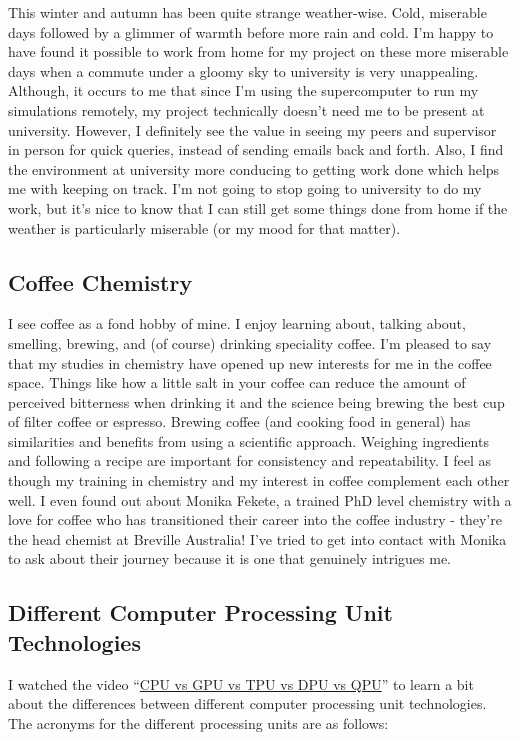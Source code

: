 \documentclass[11pt]{article}
\begin{document}
This winter and autumn has been quite strange weather-wise. Cold, miserable days followed by a glimmer of warmth before more rain and cold. I'm happy to have found it possible to work from home for my project on these more miserable days when a commute under a gloomy sky to university is very unappealing. Although, it occurs to me that since I'm using the supercomputer to run my simulations remotely, my project technically doesn't need me to be present at university. However, I definitely see the value in seeing my peers and supervisor in person for quick queries, instead of sending emails back and forth. Also, I find the environment at university more conducing to getting work done which helps me with keeping on track. I'm not going to stop going to university to do my work, but it's nice to know that I can still get some things done from home if the weather is particularly miserable (or my mood for that matter). 

\subsection{Coffee Chemistry}

I see coffee as a fond hobby of mine. I enjoy learning about, talking about, smelling, brewing, and (of course) drinking speciality coffee. I'm pleased to say that my studies in chemistry have opened up new interests for me in the coffee space. Things like how a little salt in your coffee can reduce the amount of perceived bitterness when drinking it and the science being brewing the best cup of filter coffee or espresso. Brewing coffee (and cooking food in general) has similarities and benefits from using a scientific approach. Weighing ingredients and following a recipe are important for consistency and repeatability. I feel as though my training in chemistry and my interest in coffee complement each other well. I even found out about Monika Fekete, a trained PhD level chemistry with a love for coffee who has transitioned their career into the coffee industry - they're the head chemist at Breville Australia! I've tried to get into contact with Monika to ask about their journey because it is one that genuinely intrigues me.  

\subsection{Different Computer Processing Unit Technologies}

I watched the video ``\href{https://www.youtube.com/watch?v=gd5uJ7Nlvvo}{CPU vs GPU vs TPU vs DPU vs QPU}'' to learn a bit about the differences between different computer processing unit technologies. The acronyms for the different processing units are as follows:
\end{document}
